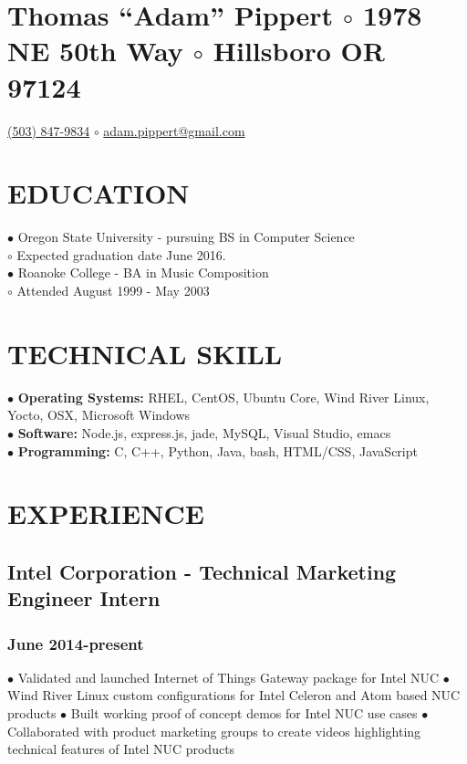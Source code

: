 \documentclass{article}
\begin{document}
\section*{Thomas ``Adam'' Pippert $\circ$
1978 NE 50th Way $\circ$
Hillsboro OR 97124}
\href{tel:+15038479834}{(503) 847-9834} $\circ$
\href{mailto:adam.pippert@gmail.com}{adam.pippert@gmail.com}

\section*{EDUCATION}

$\bullet$ Oregon State University - pursuing BS in Computer Science\\
$  \circ$ Expected graduation date June 2016.\\
$\bullet$ Roanoke College - BA in Music Composition\\
$  \circ$ Attended August 1999 - May 2003\\

\section*{TECHNICAL SKILL}

$\bullet$ \textbf{Operating Systems:} RHEL, CentOS, Ubuntu Core, Wind River Linux, Yocto, OSX, Microsoft Windows\\
$\bullet$ \textbf{Software:} Node.js, express.js, jade, MySQL, Visual Studio, emacs\\
$\bullet$ \textbf{Programming:} C, C++, Python, Java, bash, HTML/CSS, JavaScript\\

\section*{EXPERIENCE}

\subsection*{Intel Corporation - Technical Marketing Engineer Intern}
\subsubsection*{June 2014-present}

$\bullet$ Validated and launched Internet of Things Gateway package for Intel NUC
$\bullet$ Wind River Linux custom configurations for Intel Celeron and Atom based NUC products
$\bullet$ Built working proof of concept demos for Intel NUC use cases 
$\bullet$ Collaborated with product marketing groups to create videos highlighting technical features of Intel NUC products
\end{document}
